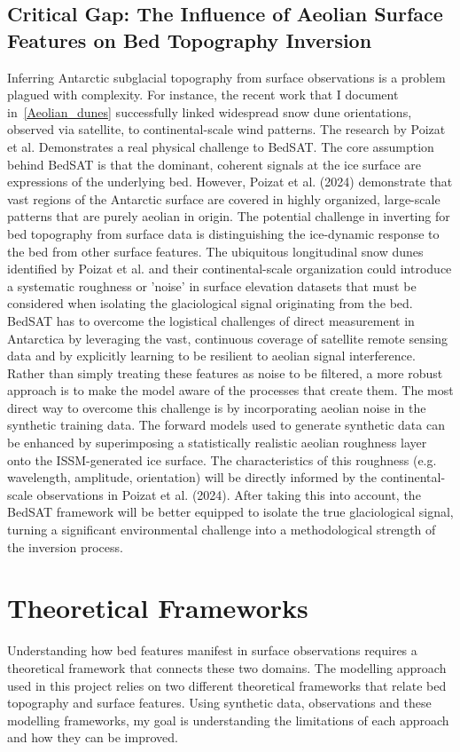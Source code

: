 \subsection{Critical Gap: The Influence of Aeolian Surface Features on Bed Topography Inversion}
Inferring Antarctic subglacial topography from surface observations is a problem plagued with complexity. For instance, the recent work that I document in~\ref{Aeolian_dunes} successfully linked widespread snow dune orientations, observed via satellite, to continental-scale wind patterns. The research by Poizat et al. Demonstrates a real physical challenge to BedSAT. The core assumption behind BedSAT is that the dominant, coherent signals at the ice surface are expressions of the underlying bed. However, Poizat et al. (2024) demonstrate that vast regions of the Antarctic surface are covered in highly organized, large-scale patterns that are purely aeolian in origin.
The potential challenge in inverting for bed topography from surface data is distinguishing the ice-dynamic response to the bed from other surface features. The ubiquitous longitudinal snow dunes identified by Poizat et al. and their continental-scale organization could introduce a systematic roughness or 'noise' in surface elevation datasets that must be considered when isolating the glaciological signal originating from the bed.
BedSAT has to overcome the logistical challenges of direct measurement in Antarctica by leveraging the vast, continuous coverage of satellite remote sensing data and by explicitly learning to be resilient to aeolian signal interference. Rather than simply treating these features as noise to be filtered, a more robust approach is to make the model aware of the processes that create them. The most direct way to overcome this challenge is by incorporating aeolian noise in the synthetic training data.
The forward models used to generate synthetic data can be enhanced by superimposing a statistically realistic aeolian roughness layer onto the ISSM-generated ice surface. The characteristics of this roughness (e.g. wavelength, amplitude, orientation) will be directly informed by the continental-scale observations in Poizat et al. (2024). 
After taking this into account, the BedSAT framework will be better equipped to isolate the true glaciological signal, turning a significant environmental challenge into a methodological strength of the inversion process.

\newpage
\section{Theoretical Frameworks}\label{theoretical_frameworks}
 Understanding how bed features manifest in surface observations requires a theoretical framework that connects these two domains. The modelling approach used in this project relies on two different theoretical frameworks that relate bed topography and surface features. Using synthetic data, observations and these modelling frameworks, my goal is understanding the limitations of each approach and how they can be improved.

